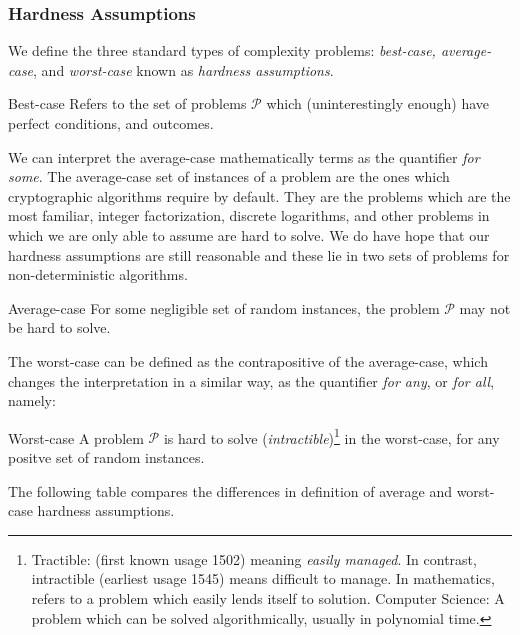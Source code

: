 \subsubsection{Hardness Assumptions}

We define the three standard types of complexity problems: \emph{best-case, average-case}, and \emph{worst-case} known as \emph{hardness assumptions}. 


\begin{defn}{Best-case}
    Refers to the set of problems $\mathcal{P}$ which (uninterestingly enough) have perfect conditions, and outcomes.
\end{defn}


We can interpret the average-case mathematically terms as the quantifier \emph{for some}. The average-case set of instances of a problem are the ones which cryptographic algorithms require by default. They are the problems which are the most familiar, integer factorization, discrete logarithms, and other problems in which we are only able to assume are hard to solve. We do have hope that our hardness assumptions are still reasonable and these lie in two sets of problems for non-deterministic algorithms.

\begin{defn}{Average-case} 
    For some negligible set of random instances, the problem $\mathcal{P}$ may not be hard to solve. 
\end{defn}


The worst-case can be defined as the contrapositive of the average-case, which changes the interpretation in a similar way, as the quantifier \emph{for any}, or \emph{for all}, namely:

\begin{defn}{Worst-case}
    A problem $\mathcal{P}$ is hard to solve (\emph{intractible})\footnote{Tractible: (first known usage 1502) meaning \textit{easily managed}. In contrast, intractible (earliest usage 1545) means difficult to manage. In mathematics, refers to a problem which easily lends itself to solution. Computer Science: A problem which can be solved algorithmically, usually in polynomial time. } in the worst-case, for any positve set of random instances.
\end{defn}



The following table compares the differences in definition of average and worst-case hardness assumptions.


